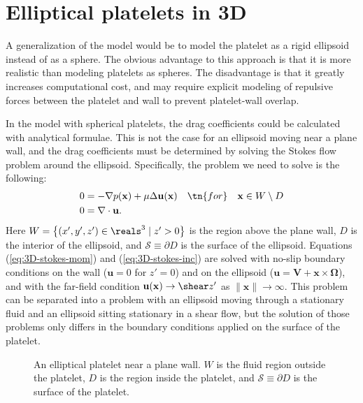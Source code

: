 \section{Elliptical platelets in 3D}
\label{sec:ellipt-plat-3d}

A generalization of the model would be to model the platelet as a
rigid ellipsoid instead of as a sphere. The obvious advantage to this
approach is that it is more realistic than modeling platelets as
spheres. The disadvantage is that it greatly increases computational
cost, and may require explicit modeling of repulsive forces between
the platelet and wall to prevent platelet-wall overlap.

In the model with spherical platelets, the drag coefficients could be
calculated with analytical formulae. This is not the case for an
ellipsoid moving near a plane wall, and the drag coefficients must be
determined by solving the Stokes flow problem around the
ellipsoid. Specifically, the problem we need to solve is the
following:
\begin{align}
  \label{eq:3D-stokes-mom}
  0 &= -\nabla p(\mathbf{x}) + \mu \Delta \mathbf{u}(\mathbf{x}) \quad
      \tn{for} \quad \mathbf{x} \in W \setminus D \\
  \label{eq:3D-stokes-inc}
  0 &= \nabla \cdot \mathbf{u}.
\end{align}
Here $W = \left\{(x', y', z') \in \reals^3 \mid z' > 0\right\}$ is the
region above the plane wall, $D$ is the interior of the ellipsoid, and
$\mathcal{S} \equiv \partial D$ is the surface of the ellipsoid. Equations
(\ref{eq:3D-stokes-mom}) and (\ref{eq:3D-stokes-inc}) are solved with
no-slip boundary conditions on the wall ($\mathbf{u} = 0$ for $z'=0$)
and on the ellipsoid
($\mathbf{u} = \mathbf{V} + \mathbf{x} \times \mathbf{\Omega}$), and
with the far-field condition
$\mathbf{u}(\mathbf{x}) \rightarrow \shear z'$ as
$\|\mathbf{x}\| \rightarrow \infty$. This problem can be separated
into a problem with an ellipsoid moving through a stationary fluid and
an ellipsoid sitting stationary in a shear flow, but the solution of
those problems only differs in the boundary conditions applied on the
surface of the platelet.

\begin{figure}
  \centering
  
  \caption[An elliptical platelet near a plane wall.]{An elliptical
    platelet near a plane wall. $W$ is the fluid region outside the
    platelet, $D$ is the region inside the platelet, and
    $\mathcal{S} \equiv \partial D$ is the surface of the platelet.}
  \label{fig:platelet}
\end{figure}

